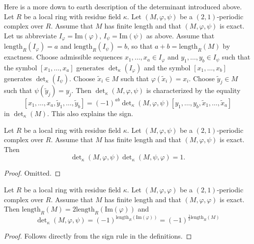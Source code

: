 \begin{remark}
\label{remark-more-elementary}
Here is a more down to earth description of the determinant
introduced above. Let $R$ be a local ring with residue field $\kappa$.
Let $(M, \varphi, \psi)$ be a $(2, 1)$-periodic complex over $R$.
Assume that $M$ has finite length and that $(M, \varphi, \psi)$ is
exact. Let us abbreviate $I_\varphi = \text{Im}(\varphi)$,
$I_\psi = \text{Im}(\psi)$ as above.
Assume that $\text{length}_R(I_\varphi) = a$ and
$\text{length}_R(I_\psi) = b$, so that $a + b = \text{length}_R(M)$
by exactness. Choose admissible sequences
$x_1, \ldots, x_a \in I_\varphi$ and $y_1, \ldots, y_b \in I_\psi$
such that the symbol $[x_1, \ldots, x_a]$ generates $\det_\kappa(I_\varphi)$
and the symbol $[x_1, \ldots, x_b]$ generates $\det_\kappa(I_\psi)$.
Choose $\tilde x_i \in M$ such that $\varphi(\tilde x_i) = x_i$.
Choose $\tilde y_j \in M$ such that $\psi(\tilde y_j) = y_j$.
Then $\det_\kappa(M, \varphi, \psi)$ is characterized
by the equality
$$
[x_1, \ldots, x_a, \tilde y_1, \ldots, \tilde y_b]
=
(-1)^{ab} \det\nolimits_\kappa(M, \varphi, \psi)
[y_1, \ldots, y_b, \tilde x_1, \ldots, \tilde x_a]
$$
in $\det_\kappa(M)$. This also explains the sign.
\end{remark}

\begin{lemma}
\label{lemma-periodic-determinant-shift}
Let $R$ be a local ring with residue field $\kappa$.
Let $(M, \varphi, \psi)$ be a $(2, 1)$-periodic complex over $R$.
Assume that $M$ has finite length and that $(M, \varphi, \psi)$ is
exact. Then
$$
\det\nolimits_\kappa(M, \varphi, \psi)
\det\nolimits_\kappa(M, \psi, \varphi)
= 1.
$$
\end{lemma}

\begin{proof}
Omitted.
\end{proof}

\begin{lemma}
\label{lemma-periodic-determinant-sign}
Let $R$ be a local ring with residue field $\kappa$.
Let $(M, \varphi, \varphi)$ be a $(2, 1)$-periodic complex over $R$.
Assume that $M$ has finite length and that $(M, \varphi, \varphi)$ is
exact. Then $\text{length}_R(M) = 2 \text{length}_R(\text{Im}(\varphi))$
and
$$
\det\nolimits_\kappa(M, \varphi, \psi)
=
(-1)^{\text{length}_R(\text{Im}(\varphi))}
=
(-1)^{\frac{1}{2}\text{length}_R(M)}
$$
\end{lemma}

\begin{proof}
Follows directly from the sign rule in the definitions.
\end{proof}

